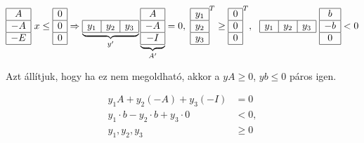 \begin{displaymath}
\begin{array}{|c|c|c|}
\hline
A \\ \hline
-A \\ \hline
-E\\  \hline
\end{array}
~ x\leq
\begin{array}{|c|c|c|}
\hline
0 \\ \hline
0 \\ \hline
0  \\  \hline
\end{array}
\Rightarrow
\underbrace{
\begin{array}{|c|c|c|}
\hline
y_1 & y_2  & y_3\\
\hline
\end{array}}_{y'}
\underbrace{
\begin{array}{|c|}
\hline
A \\
\hline
-A\\
\hline
-I \\
\hline
\end{array}}_{A'}
=0,~
\begin{array}{|c|}
\hline
y_1\\\hline
y_2\\\hline
y_3\\
\hline
\end{array}^T
\geq
\begin{array}{|c|}
\hline
0\\\hline
0\\\hline
0\\
\hline
\end{array}^T,~
~
\begin{array}{|c|c|c|}
\hline
y_1&
y_2&
y_3 \\
\hline
\end{array}
~
\begin{array}{|c|}
\hline
b\\\hline
-b\\\hline
0\\
\hline
\end{array}
<0
\end{displaymath}

Azt állítjuk, hogy ha ez nem megoldható, akkor a $ yA \geq 0$, $yb \leq 0$ páros
igen.

\begin{align*}
y_1 A + y_2 (-A) + y_3(-I) &= 0 \\
y_1 \cdot b - y_2 \cdot b + y_3 \cdot 0 &<0, \\
y_1, y_2, y_3 &\geq 0
\end{align*}

